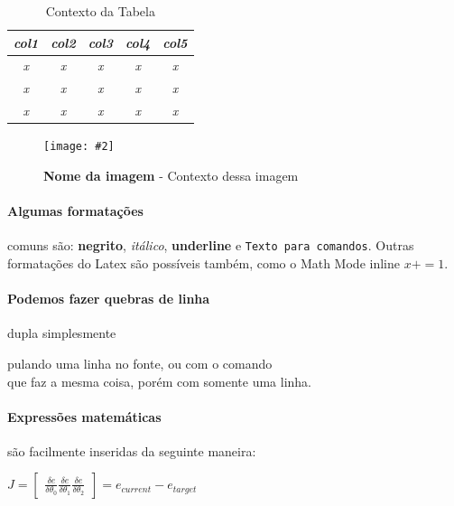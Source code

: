 \documentclass[10pt, a4paper]{article}
\newcommand{\figuremacro}[5]{
    \begin{figure}[#1]
        \centering
        \texttt{[image: \#2]}
        \caption[#3]{\textbf{#3}#4}
        \label{fig:#2}
    \end{figure}
}
\begin{document}
    \begin{table}[!htb]
\centering
\begin{tabular}{ccccc}
\hline
\textit{\textbf{col1}} & \textit{\textbf{col2}} & \textit{\textbf{col3}} & \textit{\textbf{col4}} & \textit{\textbf{col5}} \\ \hline
\textit{x}             & \textit{x}             & \textit{x}             & \textit{x}             & \textit{x}             \\
\textit{x}             & \textit{x}             & \textit{x}             & \textit{x}             & \textit{x}             \\
\textit{x}             & \textit{x}             & \textit{x}             & \textit{x}             & \textit{x}             \\ \hline
\end{tabular}
\caption{Contexto da Tabela}
\label{tab:tabela}
\end{table}

    
    \figuremacro{!htb}{arquivoexemplo}{Nome da imagem}{ - Contexto dessa imagem}{1.0}
	
    \paragraph{Algumas formatações} comuns são: \textbf{negrito}, \textit{itálico}, \textbf{underline} e \texttt{Texto para comandos}. Outras formatações do Latex são possíveis também, como o Math Mode inline $x += 1$.

    \paragraph{Podemos fazer quebras de linha} dupla simplesmente

    pulando uma linha no fonte, ou com o comando \\ que faz a mesma coisa, porém com somente uma linha.
    


    \paragraph{Expressões matemáticas} são facilmente inseridas da seguinte maneira:
    
    {\centering \Large \(
        J = \begin{bmatrix}
            \frac{\delta e}{\delta \theta _0}
            \frac{\delta e}{\delta \theta _1}
            \frac{\delta e}{\delta \theta _2}
        \end{bmatrix}
        = e_{current} - e_{target} 
    \)\par}
	
\end{document}
